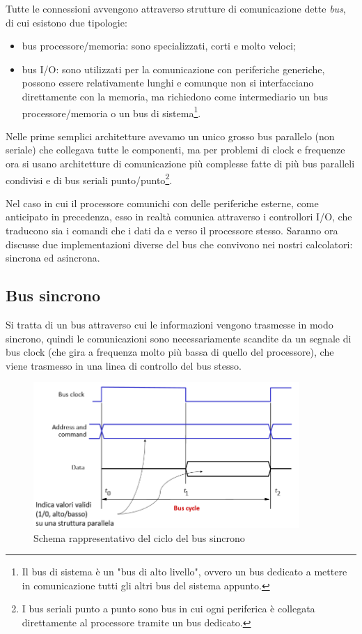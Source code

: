 \documentclass[class=book, crop=false, oneside]{standalone}
\begin{document}
Tutte le connessioni avvengono attraverso strutture di comunicazione dette \emph{bus}, di cui esistono due tipologie:
\begin{itemize}
	\item bus processore/memoria: sono specializzati, corti e molto veloci;
	\item bus I/O: sono utilizzati per la comunicazione con periferiche generiche, possono essere relativamente lunghi e comunque non si interfacciano direttamente con la memoria, ma richiedono come intermediario un bus processore/memoria o un bus di sistema\footnote{Il bus di sistema è un "bus di alto livello", ovvero un bus dedicato a  mettere in comunicazione tutti gli altri bus del sistema appunto.}.
\end{itemize}
Nelle prime semplici architetture avevamo un unico grosso bus parallelo (non seriale) che collegava tutte le componenti, ma per problemi di clock e frequenze ora si usano architetture di comunicazione più complesse fatte di più bus paralleli condivisi e di bus seriali punto/punto\footnote{I bus seriali punto a punto sono bus in cui ogni periferica è collegata direttamente al processore tramite un bus dedicato.}.

Nel caso in cui il processore comunichi con delle periferiche esterne, come anticipato in precedenza, esso in realtà comunica attraverso i controllori I/O, che traducono sia i comandi che i dati da e verso il processore stesso.
Saranno ora discusse due implementazioni diverse del bus che convivono nei nostri calcolatori: sincrona ed asincrona.

\subsection{Bus sincrono}
Si tratta di un bus attraverso cui le informazioni vengono trasmesse in modo sincrono, quindi le comunicazioni sono necessariamente scandite da un segnale di bus clock (che gira a frequenza molto più bassa di quello del processore), che viene trasmesso in una linea di controllo del bus stesso.

\begin{figure}[H]
	\centering
	\includegraphics[width=0.9\textwidth,keepaspectratio]{bus-sincrono}
	\caption{Schema rappresentativo del ciclo del bus sincrono}
\end{figure}
\end{document}

